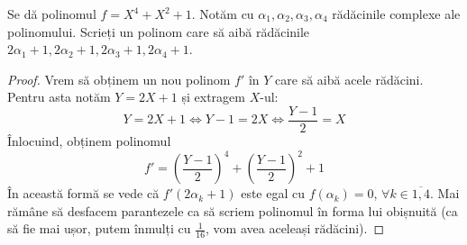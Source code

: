 \begin{exercise}
Se dă polinomul \(f = X^4 + X^2 + 1\).
Notăm cu \(\alpha_1, \alpha_2, \alpha_3, \alpha_4\) rădăcinile complexe ale polinomului. Scrieți un polinom care să aibă rădăcinile \(2 \alpha_1 + 1, 2 \alpha_2 + 1, 2 \alpha_3 + 1, 2\alpha_4 + 1\).
\end{exercise}
\begin{proof}
Vrem să obținem un nou polinom \(f'\) în \(Y\) care să aibă acele rădăcini. Pentru asta notăm \(Y = 2 X + 1\) și extragem \(X\)-ul:
\[
    Y = 2 X + 1 \iff Y - 1 = 2X \iff \frac{Y - 1}{2} = X
\]
Înlocuind, obținem polinomul
\[
    f' = \left(\frac{Y - 1}{2}\right)^4 + \left(\frac{Y - 1}{2}\right)^2 + 1
\]
În această formă se vede că \(f'(2 \alpha_k + 1)\) este egal cu \(f(\alpha_k) = 0\), \(\forall k \in \overline{1, 4}\). Mai rămâne să desfacem parantezele ca să scriem polinomul în forma lui obișnuită (ca să fie mai ușor, putem înmulți cu \(\frac{1}{16}\), vom avea aceleași rădăcini).
\end{proof}

\begin{comment}
\begin{exercise}
Fie două grupuri \((G, \cdot)\), \((H, *)\) și \(\function{f}{G}{H}\) un morfism de grupuri.
Demonstrați că preimaginea prin \(f\) a unui subgrup normal \(H' \trianglelefteq H\) este subgrup normal al lui \(G\).
\end{exercise}
\end{comment}

\begin{comment}
\begin{exercise}
Se consideră următoarele submulțimi ale lui \(\symcal{M}_2(\reals)\):
\[
A = \Set{
\begin{pmatrix}
    a & b \\
    0 & c
\end{pmatrix}
| a, c \in \reals^*, b \in \reals
},
B = \Set{
\begin{pmatrix}
    1 & b \\
    0 & 1
\end{pmatrix}
| b \in \reals
}
\]
\begin{enumerate}
    \item Arătați că \(A \leq GL_2(\reals)\).
    \item Arătați că \(B \trianglelefteq A\).
\end{enumerate}
\end{exercise}
\end{comment}

